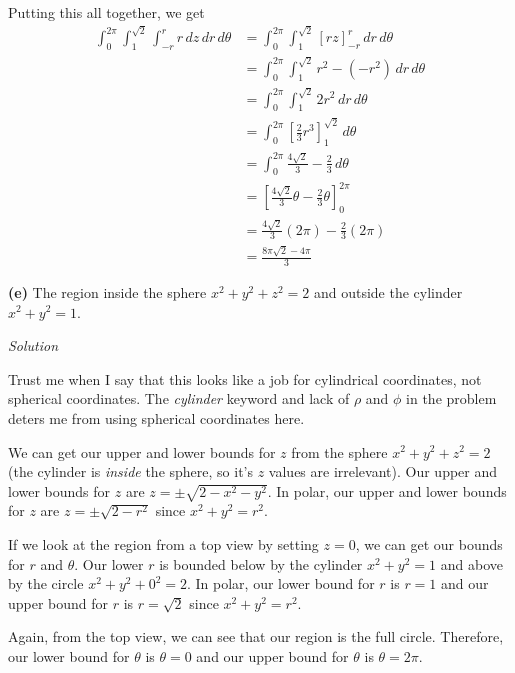 \documentclass{article}
\newcommand{\lrb}[1]{\left[ #1 \right]}
\newcommand{\Solution}{\textit{Solution}}
\begin{document}
Putting this all together, we get
\begin{align*}
    \int_0^{2\pi}\int_1^{\sqrt{2}}\int_{-r}^{r}r\,dz\,dr\,d\theta&= \int_0^{2\pi}\int_1^{\sqrt{2}}\lrb{rz}_{-r}^r\,dr\,d\theta\\
    &=\int_0^{2\pi}\int_1^{\sqrt{2}} r^2 -( -r^2)\,dr\,d\theta\\
     &=\int_0^{2\pi}\int_1^{\sqrt{2}}  2r^2\,dr\,d\theta\\
     &=\int_0^{2\pi}\lrb{\frac{2}{3}r^3}_1^{\sqrt{2}}\,d\theta\\
     &=\int_0^{2\pi} \frac{4\sqrt{2}}{3}-\frac{2}{3}\,d\theta\\
     &=\lrb{\frac{4\sqrt{2}}{3}\theta-\frac{2}{3}\theta}_0^{2\pi}\\
     &=\frac{4\sqrt{2}}{3}(2\pi)-\frac{2}{3}(2\pi)\\
     &=\boxed{\frac{8\pi\sqrt{2}-4\pi}{3}}
\end{align*}
{}\textbf{(e)} The region inside the sphere $x^2+y^2+z^2=2$ and outside the cylinder $x^2+y^2=1$.

\Solution

Trust me when I say that this looks like a job for cylindrical coordinates, not spherical coordinates. The \textit{cylinder} keyword and lack of $\rho$ and $\phi$ in the problem deters me from using spherical coordinates here.

We can get our upper and lower bounds for $z$ from the sphere $x^2+y^2+z^2=2$ (the cylinder is \textit{inside} the sphere, so it's $z$ values are irrelevant). Our upper and lower bounds for $z$ are $z=\pm\sqrt{2-x^2-y^2}$. In polar, our upper and lower bounds for $z$ are $z=\pm\sqrt{2-r^2}$ since $x^2+y^2=r^2$.

If we look at the region from a top view by setting $z=0$, we can get our bounds for $r$ and $\theta$. Our lower $r$ is bounded below by the cylinder $x^2+y^2=1$ and above by the circle $x^2+y^2+0^2=2$. In polar, our lower bound for $r$ is $r=1$ and our upper bound for $r$ is $r=\sqrt{2}$ since $x^2+y^2=r^2$.

Again, from the top view, we can see that our region is the full circle. Therefore, our lower bound for $\theta$ is $\theta=0$ and our upper bound for $\theta$ is $\theta=2\pi$.
\end{document}
